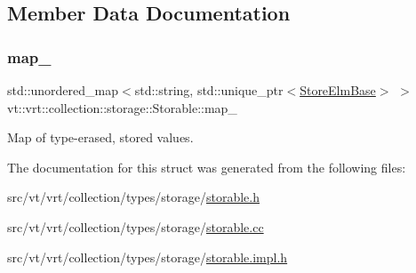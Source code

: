 \subsection{Member Data Documentation}
\mbox{\label{structvt_1_1vrt_1_1collection_1_1storage_1_1_storable_ade35c0e0ef45b53ffad56cbc349cfb82}} 
\subsubsection{\texorpdfstring{map\+\_\+}{map\_}}
{\footnotesize\ttfamily std\+::unordered\+\_\+map$<$std\+::string, std\+::unique\+\_\+ptr$<$\hyperlink{structvt_1_1vrt_1_1collection_1_1storage_1_1_store_elm_base}{Store\+Elm\+Base}$>$ $>$ vt\+::vrt\+::collection\+::storage\+::\+Storable\+::map\+\_\+\hspace{0.3cm}{\ttfamily [private]}}



Map of type-\/erased, stored values. 



The documentation for this struct was generated from the following files\+:\begin{DoxyCompactItemize}
\item 
src/vt/vrt/collection/types/storage/\hyperlink{storable_8h}{storable.\+h}\item 
src/vt/vrt/collection/types/storage/\hyperlink{storable_8cc}{storable.\+cc}\item 
src/vt/vrt/collection/types/storage/\hyperlink{storable_8impl_8h}{storable.\+impl.\+h}\end{DoxyCompactItemize}
